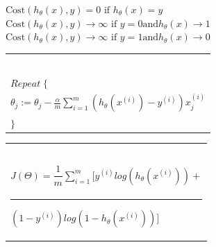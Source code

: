 \documentclass[a4paper,12pt,ngerman,fleqn]{article}
\newcommand{\mybox}[3]{
        \centering
        \begin{tabularx}{0.9\textwidth}{|X|}
            \rowcolor{accent}
            \rule{0pt}{20pt}
            \textcolor{white}{\textbf{#1}} \\
            \def\temp{#2}\ifx\temp\empty
                
            \else
                #2 \\ \hline
            \fi
            #3
            \\ \hline
        \end{tabularx}
    }
\begin{document}
\begin{minipage}[t]{.51\textwidth}
{                \(\mathrm{Cost}(h_\theta(x),y) = 0 \text{  if  } h_\theta(x) = y \) \\
                \(\mathrm{Cost}(h_\theta(x),y) \rightarrow \infty \text{  if  } y = 0 \mathrm{and} h_\theta(x) \rightarrow 1 \) \\
                \(\mathrm{Cost}(h_\theta(x),y) \rightarrow \infty \text{  if  } y = 1 \mathrm{and} h_\theta(x) \rightarrow 0 \)
            }
        \newline
    \end{minipage}%
    \begin{minipage}[t]{.51\textwidth}
        \vspace{1pt}
        \mybox
            {Gradient Descent}
            {}
            {
                \( Repeat \; \lbrace \) \\
                \( \theta_j := \theta_j - \frac{\alpha}{m} \sum_{i=1}^m (h_\theta(x^{(i)}) - y^{(i)}) x_j^{(i)} \) \\
                \(\rbrace\)
            }
        \newline
        \newline
        \newline
        \mybox
            {Simpliefied Cost Function}
            {}
            {
                \( J(\Theta) = \dfrac{1}{m} \sum\limits_{i=1}^{m}[y^{(i)}log(h_\theta(x^{(i)})) + \) \\
                \rule{38pt}{0pt}
                \( (1 - y^{(i)})log(1 - h_\theta(x^{(i)}))] \)
            }
        \newline
    \end{minipage}

    \vspace{54.5pt}
    
\end{document}
